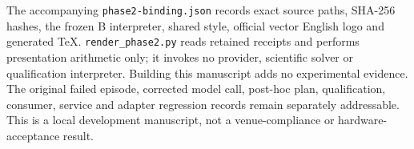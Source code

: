 The accompanying \texttt{phase2-binding.json} records exact source paths,
SHA-256 hashes, the frozen B interpreter, shared style, official vector English
logo and generated TeX. \texttt{render\_phase2.py} reads retained receipts and
performs presentation arithmetic only; it invokes no provider, scientific
solver or qualification interpreter. Building this manuscript adds no
experimental evidence. The original failed episode, corrected model call,
post-hoc plan, qualification, consumer, service and adapter regression records
remain separately addressable. This is a local development manuscript, not
a venue-compliance or hardware-acceptance result.
